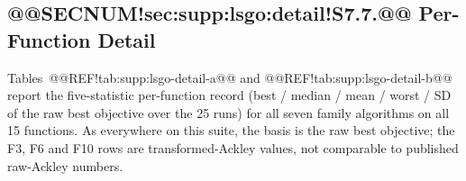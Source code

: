 \documentclass[10pt,a4paper]{article}
\begin{document}
\subsection{@@SECNUM!sec:supp:lsgo:detail!S7.7.@@ Per-Function Detail}\label{sec:supp:lsgo:detail}

Tables~@@REF!tab:supp:lsgo-detail-a@@ and @@REF!tab:supp:lsgo-detail-b@@
report the five-statistic per-function record (best / median / mean /
worst / SD of the raw best objective over the 25 runs) for all seven
family algorithms on all 15 functions.  As everywhere on this suite, the
basis is the raw best objective; the F3, F6 and F10 rows are
transformed-Ackley values, not comparable to published raw-Ackley
numbers.


\begin{table}[p]
\caption{@@TABLECAP!tab:supp:lsgo-detail-a@@ CEC2013LSGO per-function detail (F1--F8): best / median / mean /
worst / SD of the raw best objective over 25 runs for all 7 GSK-family
algorithms at the native dimension ($D = 1000$; F13/F14 at $D = 905$);
best mean per function in bold (ties all bold).  F3, F6 and F10 ran the
transformed Ackley variant and are not comparable to published
raw-Ackley values.
}\label{tab:supp:lsgo-detail-a}



\end{table}
\end{document}
